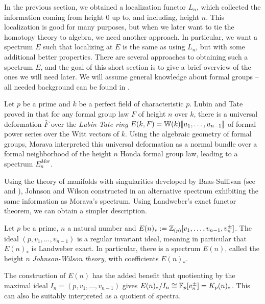 In the previous section, we obtained a localization functor $L_n$, which collected the information coming from height $0$ up to, and including, height $n$. This localization is good for many purposes, but when we later want to tie the homotopy theory to algebra, we need another approach. In particular, we want a spectrum $E$ such that localizing at $E$ is the same as using $L_n$, but with some additional better properties. There are several approaches to obtaining such a spectrum $E$, and the goal of this short section is to give a brief overview of the ones we will need later. We will assume general knowledge about formal groups -- all needed background can be found in \cite[Appendix 2]{ravenel_86}. 

\begin{remark}
    Let $p$ be a prime and $k$ be a perfect field of characteristic $p$. Lubin and Tate proved in \cite{lubin-tate_66} that for any formal group law $F$ of height $n$ over $k$, there is a universal deformation $\bar{F}$ over the \emph{Lubin-Tate ring} $E(k, F)=\mathbb{W}(k)[\![ u_1, \ldots, u_{n-1}]\!]$ of formal power series over the Witt vectors of $k$. Using the algebraic geometry of formal groups, Morava interpreted this universal deformation as a normal bundle over a formal neighborhood of the height $n$ Honda formal group law, leading to a spectrum $E^{Mor}_n$. 
\end{remark} 

Using the theory of manifolds with singularities developed by Baas-Sullivan (see \cite{baas_73a} and \cite{baas_73b}), Johnson and Wilson constructed in \cite{johnson-wilson_75} an alternative spectrum exhibiting the same information as Morava's spectrum. Using Landweber's exact functor theorem, we can obtain a simpler description. 

\begin{definition}
    Let $p$ be a prime, $n$ a natural number and $E(n)_* := \mathbb{Z}_{(p)}[v_1, \ldots, v_{n-1}, v_n^{\pm}]$. The ideal $(p, v_1, \ldots, v_{n-1})$ is a regular invariant ideal, meaning in particular that $E(n)_*$ is Landweber exact. In particular, there is a spectrum $E(n)$, called the height $n$ \emph{Johnson-Wilson theory}, with coefficients $E(n)_*$. 
\end{definition}

\begin{remark}
    \label{rm:K-as-quotient-of-E}
    The construction of $E(n)$ has the added benefit that quotienting by the maximal ideal $I_n = (p, v_1, \ldots, v_{n-1})$ gives $E(n)_*/I_n \cong \mathbb{F}_p[v_n^{\pm}] = K_p(n)_*$. This can also be suitably interpreted as a quotient of spectra. 
\end{remark}

